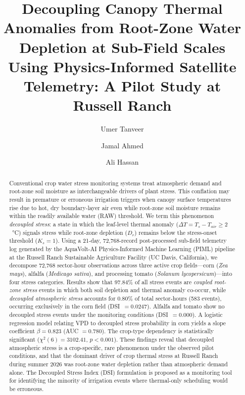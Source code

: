 \documentclass[review,12pt]{elsarticle}
\begin{document}
\begin{frontmatter}

\title{Decoupling Canopy Thermal Anomalies from Root-Zone Water Depletion at Sub-Field Scales Using Physics-Informed Satellite Telemetry: A Pilot Study at Russell Ranch}

\author[1]{Umer Tanveer}

\author[2]{Jamal Ahmed}
\author[1]{Ali Hassan}

\address[1]{Department of Computer Science, University of Lahore, Pakistan}
\address[2]{Department of Agricultural Engineering, NUST, Islamabad, Pakistan}

\begin{abstract}
Conventional crop water stress monitoring systems treat atmospheric demand and root-zone soil moisture as interchangeable drivers of plant stress. This conflation may result in premature or erroneous irrigation triggers when canopy surface temperatures rise due to hot, dry boundary-layer air even while root-zone soil moisture remains within the readily available water (RAW) threshold. We term this phenomenon \textit{decoupled stress}: a state in which the leaf-level thermal anomaly ($\Delta T = T_s - T_{air} \geq 2$~°C) signals stress while root-zone depletion ($D_r$) remains below the stress-onset threshold ($K_s = 1$). Using a 21-day, 72,768-record post-processed sub-field telemetry log generated by the AquaVolt-AI Physics-Informed Machine Learning (PIML) pipeline at the Russell Ranch Sustainable Agriculture Facility (UC Davis, California), we decompose 72,768 sector-hour observations across three active crop fields---corn (\textit{Zea mays}), alfalfa (\textit{Medicago sativa}), and processing tomato (\textit{Solanum lycopersicum})---into four stress categories. Results show that 97.84\% of all stress events are \textit{coupled root-zone stress} events in which both soil depletion and thermal anomaly co-occur, while \textit{decoupled atmospheric stress} accounts for 0.80\% of total sector-hours (583 events), occurring exclusively in the corn field (DSI~$= 0.0247$). Alfalfa and tomato show no decoupled stress events under the monitoring conditions (DSI~$= 0.000$). A logistic regression model relating VPD to decoupled stress probability in corn yields a slope coefficient $\beta = 0.823$ (AUC $= 0.780$). The crop-type dependency is statistically significant ($\chi^2(6) = 3102.41$, $p < 0.001$). These findings reveal that decoupled atmospheric stress is a crop-specific, rare phenomenon under the observed pilot conditions, and that the dominant driver of crop thermal stress at Russell Ranch during summer 2026 was root-zone water depletion rather than atmospheric demand alone. The Decoupled Stress Index (DSI) formulation is proposed as a monitoring tool for identifying the minority of irrigation events where thermal-only scheduling would be erroneous.
\end{abstract}


\end{frontmatter}
\end{document}
